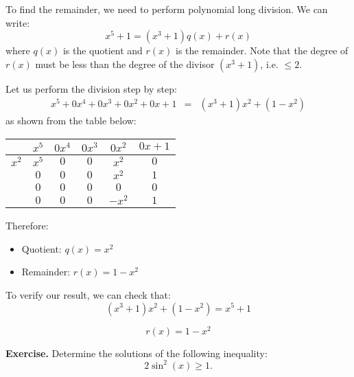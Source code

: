 \documentclass[a4paper,10 pt]{report}
\newcommand{\finalanswer}[1]{%
    \begin{finalAnswer}
    \[
        #1
    \]
    \end{finalAnswer}
}
\theoremstyle{definition}
\begin{document}
\begin{solutionBox}
	To find the remainder, we need to perform polynomial long division. We can write:
\[
    x^5 + 1 = (x^3 + 1)q(x) + r(x)
\]
where $q(x)$ is the quotient and $r(x)$ is the remainder. Note that the degree of $r(x)$ must be less than the degree of the divisor $(x^3 + 1)$, i.e. $\le 2$.


Let us perform the division step by step:
\[
\begin{array}{rcl}
x^5 + 0x^4 + 0x^3 + 0x^2 + 0x + 1 & = & (x^3 + 1)x^2 + (1-x^2)
\end{array}
\]
as shown from the table below:
\begin{center}
\begin{tabular}{r|ccccc}
    & $x^5$ & $0x^4$ & $0x^3$ & $0x^2$ & $0x + 1$ \\
\hline
$x^2$ & $x^5$ & $0$ & $0$ & $x^2$ & $0$ \\
\hline
    & $0$ & $0$ & $0$ & $x^2$ & $1$ \\
    & $0$ & $0$ & $0$ & $0$ & $0$ \\
\hline
    & $0$ & $0$ & $0$ & $-x^2$ & $1$ \\
\end{tabular}
\end{center}
Therefore:
\begin{itemize}
    \item Quotient: $q(x) = x^2$
    \item Remainder: $r(x) = 1-x^2$
\end{itemize}

To verify our result, we can check that:
\[
    (x^3 + 1)x^2 + (1-x^2) = x^5 + 1
\]

\finalanswer{r(x) = 1-x^2}
\end{solutionBox}



\begin{exerciseBox}
\textbf{Exercise.} Determine the solutions of the following inequality:
\[
2 \sin^2(x) \geq 1.
\]	
\end{exerciseBox}
\end{document}

